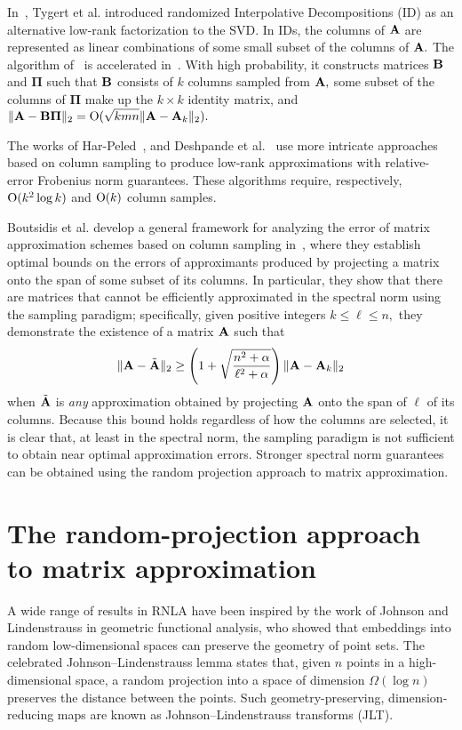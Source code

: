 In~\cite{MRT06,MRT11}, Tygert et al. introduced randomized Interpolative Decompositions (ID) as
an alternative low-rank factorization to the SVD. In IDs, the columns of $\mathbf{A}$ are 
represented as linear combinations of some small subset of the columns of $\mathbf{A}.$ The algorithm of~\cite{MRT06}
is accelerated in~\cite{WLRT08}. With high probability, it constructs matrices 
$\mathbf{B}$ and $\boldsymbol{\Pi}$ such that $\mathbf{B}$ consists of $k$ columns sampled from $\mathbf{A},$  some subset of the columns of 
$\boldsymbol{\Pi}$ make up the $k \times k$ identity matrix, and 
$ \|\mathbf{A} - \mathbf{B} \boldsymbol{\Pi}\|_2 = \mathrm{O}(\sqrt{k m n} \|\mathbf{A} - \mathbf{A}_k\|_2).$

The works of Har-Peled~\cite{HP06}, and
Deshpande et al.~\cite{DRVW06} use more intricate approaches based on column sampling to 
produce low-rank approximations with relative-error 
Frobenius norm guarantees. These algorithms require, respectively, $\mathrm{O}(k^2\log k)$ and $\mathrm{O}(k)$ column samples.

Boutsidis et al. develop a general framework for analyzing the error of 
matrix approximation schemes based on column sampling in~\cite{BDM11a}, where they establish
optimal bounds on the errors of approximants produced by projecting a matrix onto
the span of some subset of its columns. In particular, they show that there are matrices
that cannot be efficiently approximated in the spectral norm using the sampling paradigm;
specifically, given positive integers $k \leq \ell \leq n,$ they 
demonstrate the existence of a matrix $\mathbf{A}$ such that 
\[
 \|\mathbf{A} - \tilde{\mathbf{A}}\|_2 \geq \left( 1+ \sqrt{\frac{n^2 + \alpha}{\ell^2 + \alpha}}\right) \|\mathbf{A} - \mathbf{A}_k\|_2 
\]
when $\tilde{\mathbf{A}}$ is \emph{any} approximation obtained by projecting $\mathbf{A}$ onto the span of $\ell$ of its columns. Because
this bound holds regardless of how the columns are selected, it is clear that, at least in the spectral norm, the sampling paradigm is not 
sufficient to obtain near optimal approximation errors. Stronger spectral norm guarantees can be obtained using the 
random projection approach to matrix approximation.

\section{The random-projection approach to matrix approximation}

A wide range of results in RNLA have been inspired by the work of Johnson and Lindenstrauss
in geometric functional analysis, who showed that embeddings into random low-dimensional
spaces can preserve the geometry of point sets. The celebrated Johnson--Lindenstrauss lemma states that, given
$n$ points in a high-dimensional space, a random projection into a space of dimension $\Omega(\log n)$
preserves the distance between the points. Such geometry-preserving, dimension-reducing maps
are known as Johnson--Lindenstrauss transforms (JLT).

